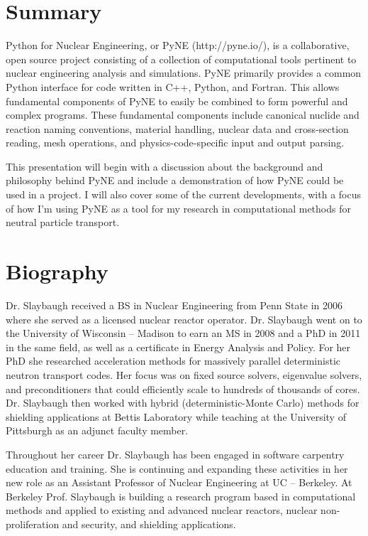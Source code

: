 \documentclass[12pt]{article}
\begin{document}


\section*{Summary}

Python for Nuclear Engineering, or PyNE (http://pyne.io/), is a collaborative, open source project consisting of a collection of
computational tools pertinent to nuclear engineering analysis and simulations.
PyNE primarily provides a common Python interface for code written in C++,
Python, and Fortran. This allows fundamental components of PyNE to easily be
combined to form powerful and complex programs. These fundamental components
include canonical nuclide and reaction naming conventions, material handling,
nuclear data and cross-section reading, mesh operations, and
physics-code-specific input and output parsing.

This presentation will begin with a discussion about the background and philosophy behind PyNE and include a demonstration of how PyNE could be used in a project. I will also cover some of the current developments, with a focus of how I'm using PyNE as a tool for my research in computational methods for neutral particle transport. 


\section*{Biography}
Dr. Slaybaugh received a BS in Nuclear Engineering from Penn State in 2006 where she served as a licensed nuclear reactor operator. Dr. Slaybaugh went on to the University of Wisconsin – Madison to earn an MS in 2008 and a PhD in 2011 in the same field, as well as a certificate in Energy Analysis and Policy. For her PhD she researched acceleration methods for massively parallel deterministic neutron transport codes. Her focus was on fixed source solvers, eigenvalue solvers, and preconditioners that could efficiently scale to hundreds of thousands of cores. Dr. Slaybaugh then worked with hybrid (deterministic-Monte Carlo) methods for shielding applications at Bettis Laboratory while teaching at the University of Pittsburgh as an adjunct faculty member. 

Throughout her career Dr. Slaybaugh has been engaged in software carpentry education and training. She is continuing and expanding these activities in her new role as an Assistant Professor of Nuclear Engineering at UC – Berkeley. At Berkeley Prof. Slaybaugh is building a research program based in computational methods and applied to existing and advanced nuclear reactors, nuclear non-proliferation and security, and shielding applications. 
\end{document}
